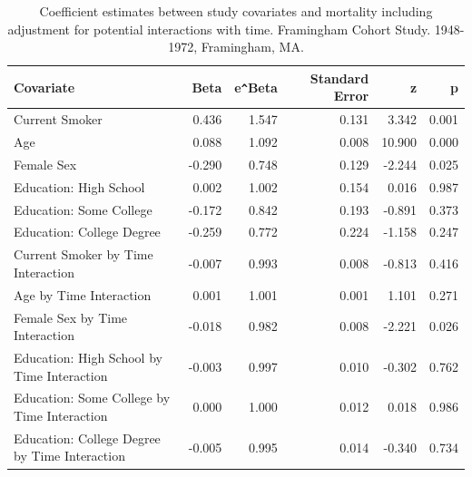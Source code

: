 \documentclass{article}\usepackage[]{graphicx}\usepackage[]{color}
\begin{document}
\begin{table}[H]
\centering
\parbox{13cm}{\caption{Coefficient estimates between study covariates and mortality including adjustment for potential interactions with time. Framingham Cohort Study. 1948-1972, Framingham, MA.}} 
\begin{tabular}{lrrrrr}
  \hline
Covariate & Beta & e\verb|^|Beta & Standard Error & z & p \\ 
  \hline
Current Smoker & 0.436 & 1.547 & 0.131 & 3.342 & 0.001 \\ 
  Age & 0.088 & 1.092 & 0.008 & 10.900 & 0.000 \\ 
  Female Sex & -0.290 & 0.748 & 0.129 & -2.244 & 0.025 \\ 
  Education: High School & 0.002 & 1.002 & 0.154 & 0.016 & 0.987 \\ 
  Education: Some College & -0.172 & 0.842 & 0.193 & -0.891 & 0.373 \\ 
  Education: College Degree & -0.259 & 0.772 & 0.224 & -1.158 & 0.247 \\ 
  Current Smoker by Time Interaction & -0.007 & 0.993 & 0.008 & -0.813 & 0.416 \\ 
  Age by Time Interaction & 0.001 & 1.001 & 0.001 & 1.101 & 0.271 \\ 
  Female Sex by Time Interaction & -0.018 & 0.982 & 0.008 & -2.221 & 0.026 \\ 
  Education: High School by Time Interaction & -0.003 & 0.997 & 0.010 & -0.302 & 0.762 \\ 
  Education: Some College by Time Interaction & 0.000 & 1.000 & 0.012 & 0.018 & 0.986 \\ 
  Education: College Degree by Time Interaction & -0.005 & 0.995 & 0.014 & -0.340 & 0.734 \\ 
   \hline
\end{tabular}
\end{table}
\end{document}

